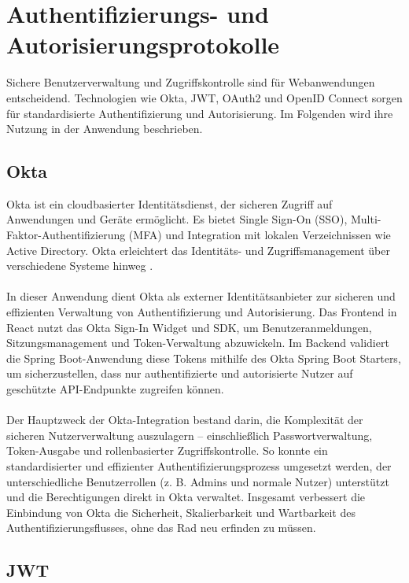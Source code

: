 \section{Authentifizierungs- und Autorisierungsprotokolle}

Sichere Benutzerverwaltung und Zugriffskontrolle sind für Webanwendungen entscheidend. Technologien wie Okta, JWT, OAuth2 und OpenID Connect sorgen für standardisierte Authentifizierung und Autorisierung. Im Folgenden wird ihre Nutzung in der Anwendung beschrieben.

\subsection{Okta}
Okta ist ein cloudbasierter Identitätsdienst, der sicheren Zugriff auf Anwendungen und Geräte ermöglicht. Es bietet Single Sign-On (SSO), Multi-Faktor-Authentifizierung (MFA) und Integration mit lokalen Verzeichnissen wie Active Directory. Okta erleichtert das Identitäts- und Zugriffsmanagement über verschiedene Systeme hinweg \cite{Okta:o.J}. \\ \\
In dieser Anwendung dient Okta als externer Identitätsanbieter zur sicheren und effizienten Verwaltung von Authentifizierung und Autorisierung. Das Frontend in React nutzt das Okta Sign-In Widget und SDK, um Benutzeranmeldungen, Sitzungsmanagement und Token-Verwaltung abzuwickeln. Im Backend validiert die Spring Boot-Anwendung diese Tokens mithilfe des Okta Spring Boot Starters, um sicherzustellen, dass nur authentifizierte und autorisierte Nutzer auf geschützte API-Endpunkte zugreifen können. \\ \\
Der Hauptzweck der Okta-Integration bestand darin, die Komplexität der sicheren Nutzerverwaltung auszulagern – einschließlich Passwortverwaltung, Token-Ausgabe und rollenbasierter Zugriffskontrolle. So konnte ein standardisierter und effizienter Authentifizierungsprozess umgesetzt werden, der unterschiedliche Benutzerrollen (z. B. Admins und normale Nutzer) unterstützt und die Berechtigungen direkt in Okta verwaltet. Insgesamt verbessert die Einbindung von Okta die Sicherheit, Skalierbarkeit und Wartbarkeit des Authentifizierungsflusses, ohne das Rad neu erfinden zu müssen.

\subsection{JWT}


